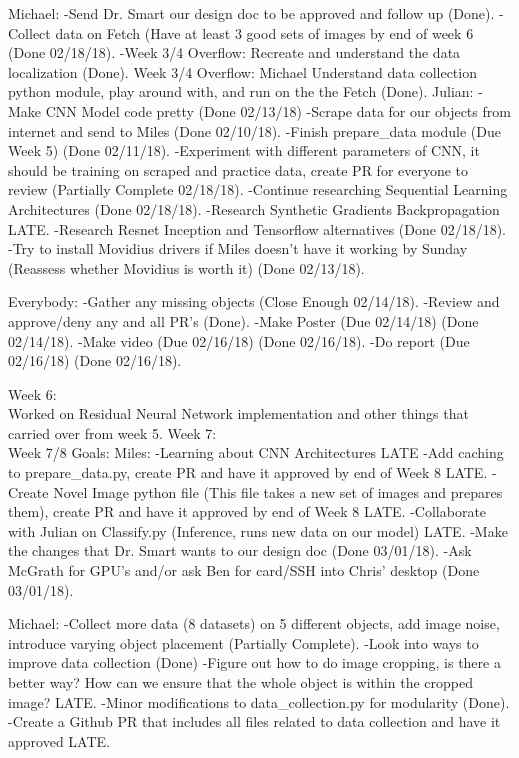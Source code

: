 \documentclass[draftclsnofoot, onecolumn, 10pt, compsoc]{IEEEtran}
\begin{document}
	Michael:
		-Send Dr. Smart our design doc to be approved and follow up (Done).
		-Collect data on Fetch (Have at least 3 good sets of images by end of week 6 (Done 02/18/18).
		-Week 3/4 Overflow: Recreate and understand the data localization (Done).
		Week 3/4 Overflow: Michael Understand data collection python module, play around with, and run on the the Fetch  (Done).
	Julian:
		-Make CNN Model code pretty (Done 02/13/18)
		-Scrape data for our objects from internet and send to Miles (Done 02/10/18).
		-Finish prepare\_data module (Due Week 5) (Done 02/11/18).
		-Experiment with different parameters of CNN, it should be training on scraped and practice data, create PR for everyone to review (Partially Complete 02/18/18).
		-Continue researching Sequential Learning Architectures (Done 02/18/18).
		-Research Synthetic Gradients Backpropagation LATE.
		-Research Resnet Inception and Tensorflow alternatives  (Done 02/18/18).
		-Try to install Movidius drivers if Miles doesn't have it working by Sunday (Reassess whether Movidius is worth it) (Done 02/13/18).
		
	Everybody:
		-Gather any missing objects (Close Enough 02/14/18).
		-Review and approve/deny any and all PR's (Done).
		-Make Poster (Due 02/14/18) (Done 02/14/18).
		-Make video (Due 02/16/18) (Done 02/16/18).
		-Do report (Due 02/16/18) (Done 02/16/18).

Week 6:
\\ \indent Worked on Residual Neural Network implementation and other things that carried over from week 5.
Week 7:
\\ \indent Week 7/8 Goals:
	Miles:
		-Learning about CNN Architectures LATE
		-Add caching to prepare\_data.py, create PR and have it approved by end of Week 8 LATE.
		-Create Novel Image python file (This file takes a new set of images and prepares them), create PR and have it approved by end of Week 8 LATE.
		-Collaborate with Julian on Classify.py (Inference,  runs new data on our model) LATE.
		-Make the changes that Dr. Smart wants to our design doc (Done 03/01/18).
		-Ask McGrath for GPU's and/or ask Ben for card/SSH into Chris' desktop (Done 03/01/18).
		
	Michael:
		-Collect more data (8 datasets) on 5 different objects, add image noise, introduce varying object placement (Partially Complete).
		-Look into ways to improve data collection (Done)
		-Figure out how to do image cropping, is there a better way? How can we ensure that the whole object is within the cropped image? LATE.
		-Minor modifications to data\_collection.py for modularity (Done).
		-Create a Github PR that includes all files related to data collection and have it approved LATE.
		
\end{document}

